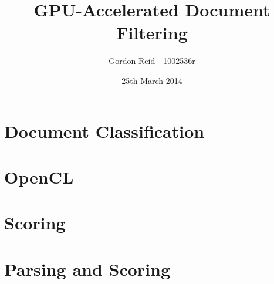\documentclass{beamer}
\title{GPU-Accelerated Document Filtering}
\author{Gordon Reid - 1002536r}
\date{25th March 2014}
\begin{document}
\frame{\titlepage}
\frame{\tableofcontents}
\section{Document Classification}
\section{OpenCL}
\section{Scoring}
\section{Parsing and Scoring}
\end{document}
